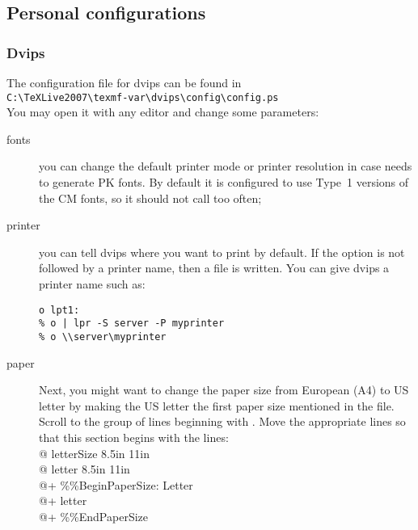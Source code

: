 \documentclass{article}
\begin{document}
\subsection{Personal configurations}
\label{sec:persconf}

\subsubsection{Dvips}

The configuration file for dvips can be found in\\
\verb+C:\TeXLive2007\texmf-var\dvips\config\config.ps+\\
You may open  it with any editor  
 and change some parameters:

\begin{description}
\item [fonts] you can change the default printer \MF{} mode or printer
  resolution in case  needs to generate PK fonts. By default it
  is configured to use Type~1 versions of the CM fonts, so it should
  not call  too often;
\item[printer] you can tell dvips where you want to print by default. If
  the  option is not followed by a printer name, then a
   \PS{} file is written. You can give dvips a printer
  name such as:
\begin{verbatim}
o lpt1:
% o | lpr -S server -P myprinter
% o \\server\myprinter
\end{verbatim}
\item[paper] Next, you might want 
  to change the paper size from European (A4) to US letter
  by making the US letter the first paper size mentioned in the file.
  Scroll to the group of lines beginning with . Move 
  the appropriate lines so that this section begins with the lines:\\
\hspace*{1em}    @ letterSize 8.5in 11in\\
\hspace*{1em}    @ letter 8.5in 11in\\
\hspace*{1em}    @+ \%\%BeginPaperSize: Letter\\
\hspace*{1em}    @+ letter\\
\hspace*{1em}    @+ \%\%EndPaperSize
\end{description}
\end{document}
